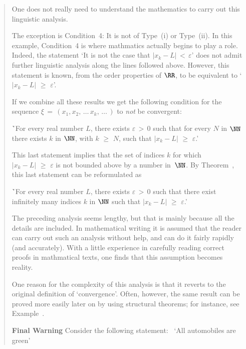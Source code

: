 \begin{quotation}
{\VA

\noindent One does not really need to understand the mathematics to carry out this linguistic analysis.

        The exception is Condition~4: It is not of Type~(i) or Type~(ii). In this example, Condition~4 is where mathmatics actually begins to play a role.
    Indeed, the statement `It is not the case that $|x_{k}-L|\,<\,{\varepsilon}$' does not admit further linguistic analysis along the lines followed above.
    However, this statement is known, from the order properties of ${\RR}$, to be equivalent to `$|x_{k}-L|\,\,{\geq}\,\,{\varepsilon}$'.

        If we combine all these results we get the following condition for the sequence
    ${\xi} \,=\, (x_{1}, x_{2},\,{\ldots}\,x_{k},\,{\ldots}\,)$ to {\em not} be convergent:

\VA

        \h `For every real number $L$, there exists ${\varepsilon}\,>\,0$ such that for every $N$ in ${\NN}$ there exists $k$ in ${\NN}$,
    with $k\,\,{\geq}\,\,N$, such that $|x_{k}-L|\,\,{\geq}\,\,{\varepsilon}$.'

\VA

        This last statement implies that the set of indices $k$ for which $|x_{k}-L|\,\,{\geq}\,\,{\varepsilon}$ is not bounded above by a number in~${\NN}$.
    By Theorem~, this last statement can be reformulated as

\VA

        \h `For every real number $L$, there exists ${\varepsilon}\,>\,0$ such that there exist infinitely many indices $k$ in ${\NN}$ such that $|x_{k}-L|\,\,{\geq}\,\,{\varepsilon}$.'

\V

        The preceding analysis seems lengthy, but that is mainly because all the details are included.
    In mathematical writing it is assumed that the reader can carry out such an analysis without help, and can do it fairly rapidly (and accurately).
    With a little experience in carefully reading correct proofs in mathmatical texts, one finds that this assumption becomes reality.

        One reason for the complexity of this analysis is that it reverts to the original definition of `convergence'.
    Often, however, the same result can be proved more easily later on by using structural theorems; for instance, see Example~.

        {\bf Final Warning} Consider the following statement: \, `All automobiles are green'

}
\end{quotation}
